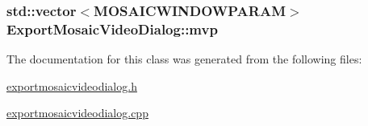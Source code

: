 \hypertarget{class_export_mosaic_video_dialog_a17b3e5b11d7ef44ef236729f02ff9bd}{
\subsubsection[{mvp}]{\setlength{\rightskip}{0pt plus 5cm}std::vector$<${\bf MOSAICWINDOWPARAM}$>$ {\bf ExportMosaicVideoDialog::mvp}}}
\label{class_export_mosaic_video_dialog_a17b3e5b11d7ef44ef236729f02ff9bd}




The documentation for this class was generated from the following files:\begin{CompactItemize}
\item 
\hyperlink{exportmosaicvideodialog_8h}{exportmosaicvideodialog.h}\item 
\hyperlink{exportmosaicvideodialog_8cpp}{exportmosaicvideodialog.cpp}\end{CompactItemize}
